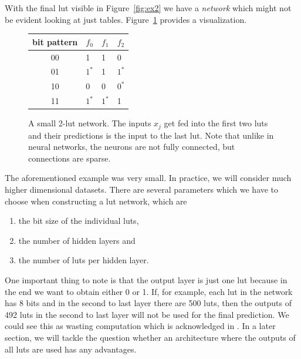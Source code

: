 \noindent With the final lut visible in Figure~\ref{fig:ex2} we have a \textit{network} which might not be evident looking at just tables. Figure~\ref{fig:first_lut_network} provides a visualization.

\begin{figure}[!htb]
    \centering
  \begin{minipage}[b]{.4\linewidth}
    \begin{tabular}{clll}
    bit pattern & $f_0$ & $f_1$ & $f_2$ \\ \hline
    00          & 1      & 1      & 0     \\
    01          & $1^*$  & 1      & $1^*$ \\
    10          & 0      & 0      & $0^*$ \\
    11          & $1^*$  & $1^*$ & 1    
    \end{tabular}
    \vspace{1.5em}
  \end{minipage}
    
\caption{A small 2-lut network. The inputs $x_j$ get fed into the first two luts and their predictions is the input to the last lut. Note that unlike in neural networks, the neurons are not fully connected, but connections are sparse.}
\label{fig:first_lut_network}
\end{figure}

\noindent The aforementioned example was very small. In practice, we will consider much higher dimensional datasets. There are several parameters which we have to choose when constructing a lut network, which are

\vspace{0.5em}
\begin{enumerate}
    \item the bit size of the individual luts,
    \item the number of hidden layers and
    \item the number of luts per hidden layer.
\end{enumerate}

\noindent One important thing to note is that the output layer is just one lut because in the end we want to obtain either 0 or 1. If, for example, each lut in the network has 8 bits and in the second to last layer there are 500 luts, then the outputs of 492 luts in the second to last layer will not be used for the final prediction. We could see this as wasting computation which is acknowledged in \cite{chatterjee2018learning}. In a later section, we will tackle the question whether an architecture where the outputs of all luts are used has any advantages.

